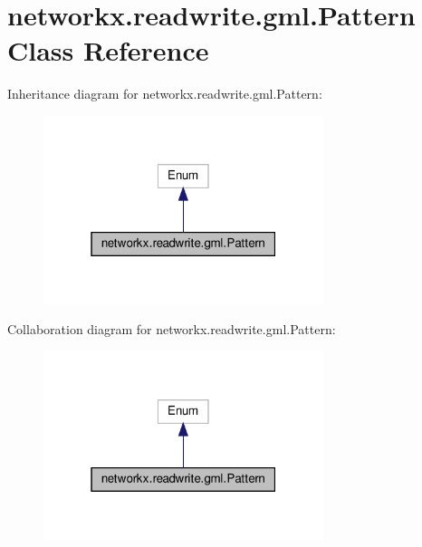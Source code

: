 \hypertarget{classnetworkx_1_1readwrite_1_1gml_1_1Pattern}{}\section{networkx.\+readwrite.\+gml.\+Pattern Class Reference}
\label{classnetworkx_1_1readwrite_1_1gml_1_1Pattern}


Inheritance diagram for networkx.\+readwrite.\+gml.\+Pattern\+:
\nopagebreak
\begin{figure}[H]
\begin{center}
\leavevmode
\includegraphics[width=232pt]{classnetworkx_1_1readwrite_1_1gml_1_1Pattern__inherit__graph}
\end{center}
\end{figure}


Collaboration diagram for networkx.\+readwrite.\+gml.\+Pattern\+:
\nopagebreak
\begin{figure}[H]
\begin{center}
\leavevmode
\includegraphics[width=232pt]{classnetworkx_1_1readwrite_1_1gml_1_1Pattern__coll__graph}
\end{center}
\end{figure}
